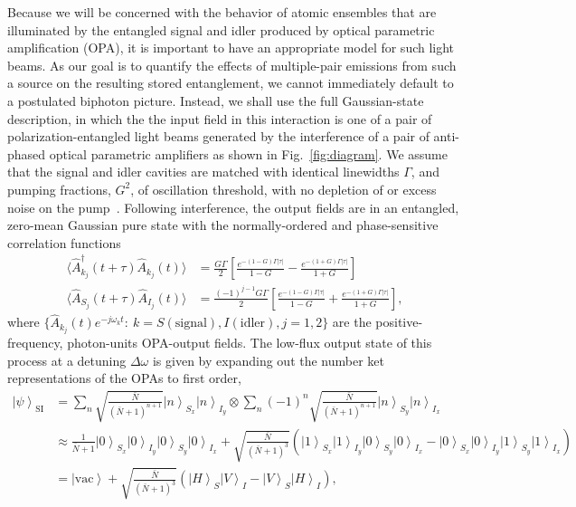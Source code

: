 \documentclass[aps,twocolumn,secnumarabic,amsmath,amssymb,pra,groupedaddress,
showpacs, showkeys]{revtex4-1}
\newcommand{\ket}[1]{\left|#1\right\rangle}
\newcommand{\pna}[1]{\left(#1\right)}
\newcommand{\pnb}[1]{\left[#1\right]}
\newcommand{\abs}[1]{\left|#1\right|}
\begin{document}
Because we will be concerned with the behavior of atomic ensembles that are
illuminated by the entangled signal and idler produced by optical parametric
amplification (OPA), it is important to have an appropriate model for such
light beams. As our goal is to quantify the effects of multiple-pair emissions
from such a source on the resulting stored entanglement, we cannot immediately
default to a postulated biphoton picture. Instead, we shall use the full
Gaussian-state description, in which the the input field in this interaction is
one of a pair of polarization-entangled light beams generated by the
interference of a pair of anti-phased optical parametric amplifiers as shown in
Fig.~\ref{fig:diagram}. We assume that the signal and idler cavities are
matched with identical linewidths $\Gamma$, and pumping fractions, $G^2$, of
oscillation threshold, with no depletion of or excess noise on the
pump~\cite{1367-2630-4-1-347, 1464-4266-2-1-101}. Following interference, the
output fields are in an entangled, zero-mean Gaussian pure state with the
normally-ordered and phase-sensitive correlation functions
\begin{align}
\langle \hat{A}^{\dagger}_{k_j}\pna{t+\tau} \hat{A}_{k_j}\pna{t}\rangle & =\frac{G \Gamma}{2} 
\pnb{\frac{e^{-\pna{1-G}\Gamma \abs{\tau}}}{1-G}-\frac{e^{-\pna{1+G}\Gamma \abs{\tau}}}{1+G}}\nonumber \\
\langle \hat{A}_{S_j}\pna{t+\tau} \hat{A}_{I_j}\pna{t}\rangle & =\frac{\pna{-1}^{j-1}G \Gamma}{2} 
\pnb{\frac{e^{-\pna{1-G}\Gamma \abs{\tau}}}{1-G}+\frac{e^{-\pna{1+G}\Gamma \abs{\tau}}}{1+G}},	
\end{align}
where $\{\hat{A}_{k_j}\pna{t}e^{-j\omega_k
  t}:~k=S\pna{\textrm{signal}},I\pna{\textrm{idler}},j=1,2\}$ are the positive-frequency, photon-units OPA-output fields. The low-flux output state
of this process at a detuning $\Delta \omega$ is given by expanding out the
number ket representations of the OPAs to first order,
\begin{align}
\ket{\psi}_{\textrm{SI}} & = \sum_n \sqrt{\frac{\bar{N}}{\pna{\bar{N}+1}^{n+1}}} \ket{n}_{S_x}\ket{n}_{I_y} \otimes \sum_n \pna{-1}^n \sqrt{\frac{\bar{N}}{\pna{\bar{N}+1}^{n+1}}} \ket{n}_{S_y}\ket{n}_{I_x} \nonumber \\
& \approx\frac{1}{\bar{N}+1} \ket{0}_{S_x}\ket{0}_{I_y}\ket{0}_{S_y}\ket{0}_{I_x}+ \sqrt{\frac{\bar{N}}{\pna{\bar{N}+1}^{3}}}\pna{\ket{1}_{S_x}\ket{1}_{I_y}\ket{0}_{S_y}\ket{0}_{I_x}-\ket{0}_{S_x}\ket{0}_{I_y}\ket{1}_{S_y}\ket{1}_{I_x}}\nonumber \\
& = \ket{\textrm{vac}}+\sqrt{\frac{\bar{N}}{\pna{\bar{N}+1}^{3}}}\pna{\ket{H}_S\ket{V}_I-\ket{V}_S\ket{H}_I},\label{eq:final_singlet}
\end{align}
\end{document}
